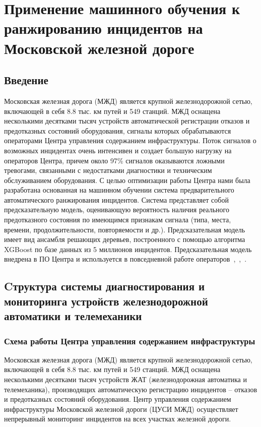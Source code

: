 \DeclareRobustCommand{\nomenclature}[2]{%
}

\DeclareRobustCommand{\cyrins}[1]{%
 #1
}

\chapter{Применение машинного обучения к ранжированию инцидентов на Московской железной дороге} \label{chapt2}

\section{Введение}
Московская железная дорога (МЖД) \nomenclature{МЖД}{Московская железная дорога} является крупной железнодорожной сетью, включающей в себя 8.8 тыс. км путей и 549 станций. МЖД оснащена несколькими десятками тысяч устройств автоматической регистрации отказов и предотказных состояний оборудования, сигналы которых обрабатываются операторами Центра управления содержанием инфраструктуры. Поток сигналов о возможных инцидентах очень интенсивен и создает большую нагрузку на операторов Центра, причем около 97\% сигналов оказываются ложными тревогами, связанными с недостатками диагностики и техническим обслуживанием оборудования. С целью оптимизации работы Центра нами была разработана основанная на машинном обучении система предварительного автоматического ранжирования инцидентов. Система представляет собой предсказательную модель, оценивающую вероятность наличия реального предотказного состояния по имеющимся признакам сигнала (типа, места, времени,  продолжительности, повторяемости и др.). Предсказательная модель имеет вид ансамбля решающих деревьев, построенного с помощью алгоритма XGBoost по базе данных из 5 миллионов инцидентов. Предсказательная модель внедрена в ПО Центра и используется в повседневной работе операторов~\cite{bulletin-rzd},~\cite{itivs-2017},~\cite{icmla-2017}.

\section{Cтруктура системы диагностирования и мониторинга устройств железнодорожной автоматики и телемеханики}
\subsection{Схема работы Центра управления содержанием инфраструктуры}
Московская железная дорога (МЖД) \nomenclature{МЖД}{Московская железная дорога} является крупной железнодорожной сетью, включающей в себя 8.8 тыс. км путей и 549 станций. МЖД оснащена несколькими десятками тысяч устройств ЖАТ (железнодорожная автоматика и телемеханика), производящих автоматическую регистрацию инцидентов -- отказов и предотказных состояний оборудования. Центр управления содержанием инфраструктуры \nomenclature{ЦУСИ}{Центр управления содержанием инфраструктуры} Московской железной дороги (ЦУСИ МЖД) осуществляет непрерывный мониторинг инцидентов на всех участках железной дороги. 
\nomenclature{ЖАТ}{Железнодорожная автоматика и телемеханика}

